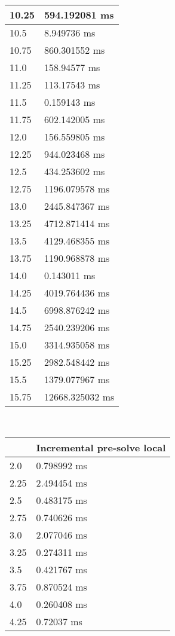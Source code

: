 \begin{multicols}{2}
\begin{tabular}{|l|l|}
		10.25 & 594.192081 ms \\ \hline
		10.5 & 8.949736 ms \\ \hline
		10.75 & 860.301552 ms \\ \hline
		11.0 & 158.94577 ms \\ \hline
		11.25 & 113.17543 ms \\ \hline
		11.5 & 0.159143 ms \\ \hline
		11.75 & 602.142005 ms \\ \hline
		12.0 & 156.559805 ms \\ \hline
		12.25 & 944.023468 ms \\ \hline
		12.5 & 434.253602 ms \\ \hline
		12.75 & 1196.079578 ms \\ \hline
		13.0 & 2445.847367 ms \\ \hline
		13.25 & 4712.871414 ms \\ \hline
		13.5 & 4129.468355 ms \\ \hline
		13.75 & 1190.968878 ms \\ \hline
		14.0 & 0.143011 ms \\ \hline
		14.25 & 4019.764436 ms \\ \hline
		14.5 & 6998.876242 ms \\ \hline
		14.75 & 2540.239206 ms \\ \hline
		15.0 & 3314.935058 ms \\ \hline
		15.25 & 2982.548442 ms \\ \hline
		15.5 & 1379.077967 ms \\ \hline
		15.75 & 12668.325032 ms \\ \hline
	\end{tabular}\\
	\begin{tabular}{|l|l|}
		\hline
		& Incremental pre-solve local \\ \hline
		2.0 & 0.798992 ms \\ \hline
		2.25 & 2.494454 ms \\ \hline
		2.5 & 0.483175 ms \\ \hline
		2.75 & 0.740626 ms \\ \hline
		3.0 & 2.077046 ms \\ \hline
		3.25 & 0.274311 ms \\ \hline
		3.5 & 0.421767 ms \\ \hline
		3.75 & 0.870524 ms \\ \hline
		4.0 & 0.260408 ms \\ \hline
		4.25 & 0.72037 ms \\ \hline

\end{tabular}
\end{multicols}
